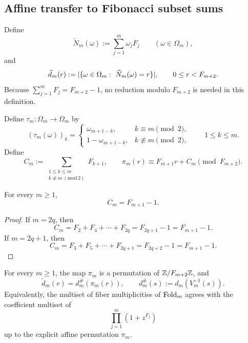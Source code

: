 \subsection{Affine transfer to Fibonacci subset sums}

\begin{definition}
\label{def:shifted-spectrum}
Define
\[
  \widetilde N_m(\omega):=\sum_{j=1}^m \omega_jF_j
  \qquad (\omega\in\Omega_m),
\]
and
\[
  \widetilde d_m(r):=
  \lvert \{\omega\in\Omega_m:\ \widetilde N_m(\omega)=r\} \rvert,
  \qquad 0\le r<F_{m+2}.
\]
Because \(\sum_{j=1}^m F_j=F_{m+2}-1\), no reduction modulo \(F_{m+2}\) is
needed in this definition.
\end{definition}

\begin{definition}
\label{def:affine-map}
Define \(\tau_m\colon \Omega_m\to\Omega_m\) by
\[
  (\tau_m(\omega))_k=
  \begin{cases}
    \omega_{m+1-k}, & k\equiv m \pmod 2,\\[4pt]
    1-\omega_{m+1-k}, & k\not\equiv m \pmod 2,
  \end{cases}
  \qquad 1\le k\le m.
\]
Define
\[
  C_m:=\sum_{\substack{1\le k\le m\\ k\not\equiv m \,(\mathrm{mod}\,2)}}F_{k+1},
  \qquad
  \pi_m(r)\equiv F_{m+1}r+C_m \pmod{F_{m+2}}.
\]
\end{definition}

\begin{lemma}
\label{lem:Cm-closed}
For every \(m\ge 1\),
\[
  C_m=F_{m+1}-1.
\]
\end{lemma}

\begin{proof}
If \(m=2q\), then
\[
  C_m=F_2+F_4+\cdots+F_{2q}=F_{2q+1}-1=F_{m+1}-1.
\]
If \(m=2q+1\), then
\[
  C_m=F_3+F_5+\cdots+F_{2q+1}=F_{2q+2}-1=F_{m+1}-1.
\]
\end{proof}

\begin{theorem}
\label{thm:affine-transfer}
For every \(m\ge 1\), the map \(\pi_m\) is a permutation of
\(\mathbb{Z}/F_{m+2}\mathbb{Z}\), and
\[
  \widetilde d_m(r)=d_m^\#(\pi_m(r)),
  \qquad
  d_m^\#(s):=d_m(V_m^{-1}(s)).
\]
Equivalently, the multiset of fiber multiplicities of \(\mathrm{Fold}_m\) agrees with
the coefficient multiset of
\[
  \prod_{j=1}^m(1+z^{F_j})
\]
up to the explicit affine permutation \(\pi_m\).
\end{theorem}

